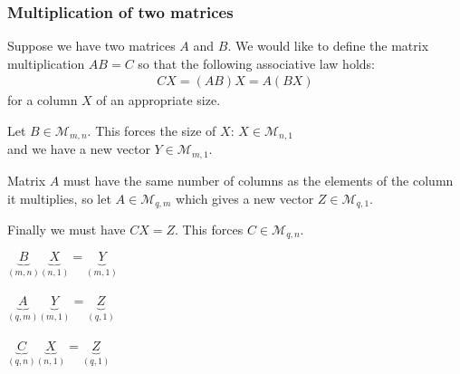 \documentclass[usenames,dvipsnames,aspectratio=169,10pt]{beamer}
\numberwithin{equation}{section}
\begin{document}
\begin{frame}
\frametitle{Multiplication of two matrices}
Suppose we have two matrices $A$ and $B$. We would like to define the matrix multiplication $AB=C$ so that the following associative law holds:
\begin{align*}
CX = (AB)X = A(BX)
\end{align*}
for a column $X$ of an appropriate size.

\begin{minipage}{0.6\textwidth}
Let $B\in \mathcal{M}_{m,n}$. This forces the size of $X$: $X\in\mathcal{M}_{n,1}$ \\
and we have a new vector $Y\in\mathcal{M}_{m,1}$. 

Matrix $A$ must have the same number of columns as the elements of the column it multiplies, so let $A\in\mathcal{M}_{q,m}$ which gives a new vector $Z\in\mathcal{M}_{q,1}$. 

Finally we must have $CX = Z$. This forces $C\in\mathcal{M}_{q,n}$.

\end{minipage}\hspace{1cm}
\begin{minipage}{0.3\textwidth}
$\underbrace{B}_{(m,n)} \underbrace{X}_{(n,1)} = \underbrace{Y}_{(m,1)}$ 
\\
\vspace{0.1cm}
\\
$\underbrace{A}_{(q,m)} \underbrace{Y}_{(m,1)} = \underbrace{Z}_{(q,1)}$
\\
\vspace{0.1cm}
\\
$\underbrace{C}_{(q,n)} \underbrace{X}_{(n,1)} = \underbrace{Z}_{(q,1)}$
\end{minipage}

\end{frame}
\end{document}
